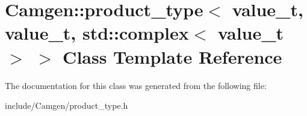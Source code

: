 \hypertarget{a00435}{\section{Camgen\-:\-:product\-\_\-type$<$ value\-\_\-t, value\-\_\-t, std\-:\-:complex$<$ value\-\_\-t $>$ $>$ Class Template Reference}
\label{a00435}
}


The documentation for this class was generated from the following file\-:\begin{DoxyCompactItemize}
\item 
include/\-Camgen/product\-\_\-type.\-h\end{DoxyCompactItemize}

